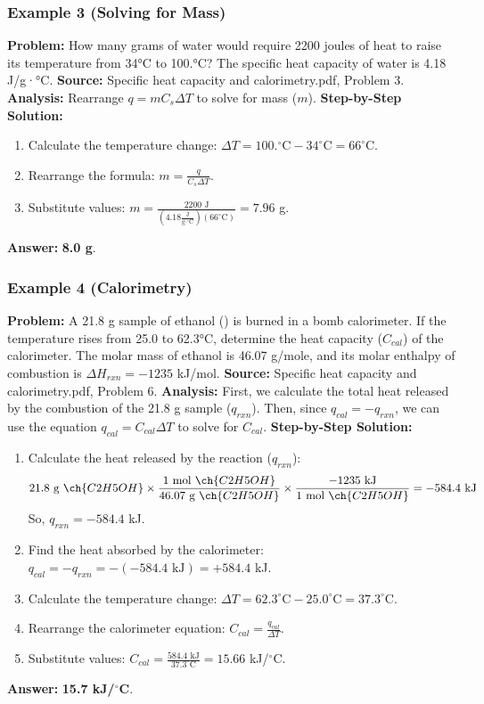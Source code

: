 \documentclass{article}
\begin{document}
\subsubsection{Example 3 (Solving for Mass)}
\textbf{Problem:} How many grams of water would require 2200 joules of heat to raise its temperature from 34°C to 100.°C? The specific heat capacity of water is 4.18 J/g·°C.
\textbf{Source:} Specific heat capacity and calorimetry.pdf, Problem 3.
\textbf{Analysis:} Rearrange $q=mC_s\Delta T$ to solve for mass ($m$).
\textbf{Step-by-Step Solution:}
\begin{enumerate}
    \item Calculate the temperature change: $\Delta T = 100.^\circ\text{C} - 34^\circ\text{C} = 66^\circ\text{C}$.
    \item Rearrange the formula: $m = \frac{q}{C_s\Delta T}$.
    \item Substitute values: $m = \frac{2200 \text{ J}}{(4.18 \frac{\text{J}}{\text{g}\cdot^\circ\text{C}})(66^\circ\text{C})} = 7.96$ g.
\end{enumerate}
\textbf{Answer:} \textbf{8.0 g}.

\subsubsection{Example 4 (Calorimetry)}
\textbf{Problem:} A 21.8 g sample of ethanol () is burned in a bomb calorimeter. If the temperature rises from 25.0 to 62.3°C, determine the heat capacity ($C_{cal}$) of the calorimeter. The molar mass of ethanol is 46.07 g/mole, and its molar enthalpy of combustion is $\Delta H_{rxn} = -1235$ kJ/mol.
\textbf{Source:} Specific heat capacity and calorimetry.pdf, Problem 6.
\textbf{Analysis:} First, we calculate the total heat released by the combustion of the 21.8 g sample ($q_{rxn}$). Then, since $q_{cal} = -q_{rxn}$, we can use the equation $q_{cal} = C_{cal}\Delta T$ to solve for $C_{cal}$.
\textbf{Step-by-Step Solution:}
\begin{enumerate}
    \item Calculate the heat released by the reaction ($q_{rxn}$):
    \[ 21.8 \text{ g } \ch{C2H5OH} \times \frac{1 \text{ mol } \ch{C2H5OH}}{46.07 \text{ g } \ch{C2H5OH}} \times \frac{-1235 \text{ kJ}}{1 \text{ mol } \ch{C2H5OH}} = -584.4 \text{ kJ} \]
    So, $q_{rxn} = -584.4$ kJ.
    \item Find the heat absorbed by the calorimeter: $q_{cal} = -q_{rxn} = -(-584.4 \text{ kJ}) = +584.4$ kJ.
    \item Calculate the temperature change: $\Delta T = 62.3^\circ\text{C} - 25.0^\circ\text{C} = 37.3^\circ\text{C}$.
    \item Rearrange the calorimeter equation: $C_{cal} = \frac{q_{cal}}{\Delta T}$.
    \item Substitute values: $C_{cal} = \frac{584.4 \text{ kJ}}{37.3^\circ\text{C}} = 15.66$ kJ/$^\circ$C.
\end{enumerate}
\textbf{Answer:} \textbf{15.7 kJ/$^\circ$C}.
\end{document}
